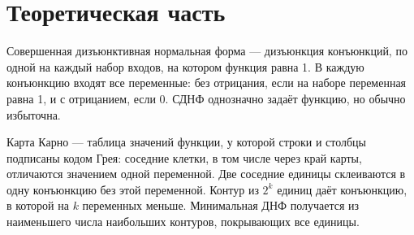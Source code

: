 \section{Теоретическая часть}
Совершенная дизъюнктивная нормальная форма — дизъюнкция конъюнкций, по одной на каждый
набор входов, на котором функция равна 1. В каждую конъюнкцию входят все переменные: без
отрицания, если на наборе переменная равна 1, и с отрицанием, если 0. СДНФ однозначно
задаёт функцию, но обычно избыточна.

Карта Карно — таблица значений функции, у которой строки и столбцы подписаны кодом Грея:
соседние клетки, в том числе через край карты, отличаются значением одной переменной. Две
соседние единицы склеиваются в одну конъюнкцию без этой переменной. Контур из $2^k$ единиц
даёт конъюнкцию, в которой на $k$ переменных меньше. Минимальная ДНФ получается из
наименьшего числа наибольших контуров, покрывающих все единицы.
